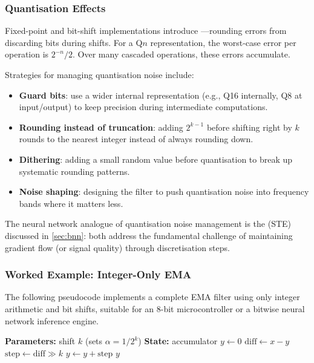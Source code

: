 \subsubsection{Quantisation Effects}

Fixed-point and bit-shift implementations introduce
---rounding errors from discarding bits
during shifts. For a Q$n$ representation, the worst-case error per
operation is $2^{-n}/2$. Over many cascaded operations, these errors
accumulate.

Strategies for managing quantisation noise include:

\begin{itemize}[leftmargin=2em]
  \item \textbf{Guard bits}: use a wider internal representation
    (e.g., Q16 internally, Q8 at input/output) to keep precision
    during intermediate computations.
  \item \textbf{Rounding instead of truncation}: adding
    $2^{k-1}$ before shifting right by $k$ rounds to the nearest
    integer instead of always rounding down.
  \item \textbf{Dithering}: adding a small random value before
    quantisation to break up systematic rounding patterns.
  \item \textbf{Noise shaping}: designing the filter to push
    quantisation noise into frequency bands where it matters less.
\end{itemize}

The neural network analogue of quantisation noise management is the
 (STE) discussed in
\cref{sec:bnn}: both address the fundamental challenge of maintaining
gradient flow (or signal quality) through discretisation steps.

\subsubsection{Worked Example: Integer-Only EMA}

The following pseudocode implements a complete EMA filter using only
integer arithmetic and bit shifts, suitable for an 8-bit
microcontroller or a bitwise neural network inference engine.

\begin{algorithm}[htbp]
\caption{Integer-only EMA with bit shifts}
\label{alg:ema-integer}
\begin{algorithmic}[1]
\State \textbf{Parameters:} shift $k$ (sets $\alpha = 1/2^k$)
\State \textbf{State:} accumulator $y \gets 0$ 
 
  \State $\text{diff} \gets x - y$ 
  \State $\text{step} \gets \text{diff} \gg k$ 
  \State $y \gets y + \text{step}$ 
  \State \Return $y$
\EndProcedure
\end{algorithmic}
\end{algorithm}

